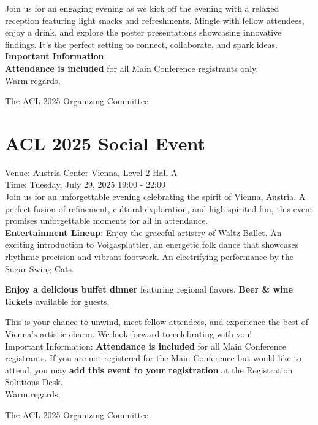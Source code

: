 Join us for an engaging evening as we kick off the evening with a relaxed reception featuring light snacks and refreshments. Mingle with fellow attendees, enjoy a drink, and explore the poster presentations showcasing innovative findings. It’s the perfect setting to connect, collaborate, and spark ideas.\\

\textbf{Important Information}:\\
\textbf{Attendance is included} for all Main Conference registrants only.\\

Warm regards,

The ACL 2025 Organizing Committee


\clearpage


\section{ACL 2025 Social Event}
\vspace*{0.2cm}

Venue: Austria Center Vienna, Level 2 Hall A\\
Time: Tuesday, July 29, 2025 19:00 - 22:00\\

Join us for an unforgettable evening celebrating the spirit of Vienna, Austria. A perfect fusion of refinement, cultural exploration, and high-spirited fun, this event promises unforgettable moments for all in attendance.\\

\textbf{Entertainment Lineup}:
Enjoy the graceful artistry of Waltz Ballet. 
An exciting introduction to Voigasplattler, an energetic folk dance that showcases rhythmic precision and vibrant footwork.
An electrifying performance by the Sugar Swing Cats.

\textbf{Enjoy a delicious buffet dinner} featuring regional flavors. 
\textbf{Beer \& wine tickets} available for guests.

This is your chance to unwind, meet fellow attendees, and experience the best of Vienna’s artistic charm. We look forward to celebrating with you!\\

Important Information:
\textbf{Attendance is included} for all Main Conference registrants.
If you are not registered for the Main Conference but would like to attend, you may \textbf{add this event to your registration} at the Registration Solutions Desk.\\

Warm regards,

The ACL 2025 Organizing Committee
